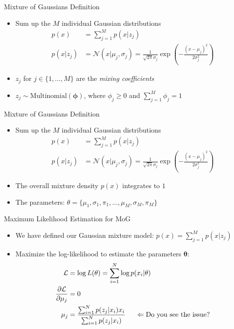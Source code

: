\begin{frame}{Mixture of Gaussians Definition}{}
	\begin{itemize}
		\item Sum up the $M$ individual Gaussian distributions
		\begin{align}
			p(x) &= \sum_{j=1}^M p(x|z_j)\\
			p(x|z_j) &= \mathcal{N}(x|\mu_j, \sigma_j) = \frac{1}{\sqrt{2\pi}\sigma_j} \exp\left(-\frac{(x - \mu_j)^2}{2\sigma_j^2}\right)
		\end{align}
		\item $z_j$ for $j \in \{1, \dots, M\}$ are the \textit{mixing coefficients}
		\item $z_j \sim \text{Multinomial}(\bm{\phi})$, where $\phi_j \ge 0$ and $\sum_{j=1}^M \phi_j = 1$
	\end{itemize}
\end{frame}

\begin{frame}{Mixture of Gaussians Definition}{}
	\begin{itemize}
		\item Sum up the $M$ individual Gaussian distributions
		\begin{align}
			p(x) &= \sum_{j=1}^M p(x|z_j)\\
			p(x|z_j) &= \mathcal{N}(x|\mu_j, \sigma_j) = \frac{1}{\sqrt{2\pi}\sigma_j} \exp\left(-\frac{(x - \mu_j)^2}{2\sigma_j^2}\right)
		\end{align}
		\item The overall mixture density $p(x)$ integrates to $1$
		\item The parameters: $\theta = \{\mu_1, \sigma_1, \pi_1, \dots, \mu_M, \sigma_M, \pi_M\}$
		\begin{boxBlueNoFrame}
		\end{boxBlueNoFrame}
	\end{itemize}
\end{frame}

\begin{frame}{Maximum Likelihood Estimation for MoG}{}
	\begin{itemize}
		\item We have defined our Gaussian mixture model: $p(x) = \sum_{j=1}^M p(x|z_j)$
		\item Maximize the log-likelihood to estimate the parameters $\bm{\theta}$:
		\begin{align}
			\mathcal{L} &= \log L(\theta) = \sum_{i=1}^N \log p(x_i|\theta)\\
			\frac{\partial \mathcal{L}}{\partial \mu_j} &= 0\\
			\mu_j &= \frac{\sum_{i=1}^N p(z_j|x_i) x_i}{\sum_{i=1}^N p(z_j|x_i)}\hspace{0.5cm} \Leftarrow \text{Do you see the issue?}
		\end{align}
	\end{itemize}
\end{frame}

